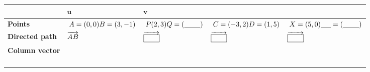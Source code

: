 \documentclass[12pt,a4paper]{article}
\begin{document}
\begin{center}
\small
\begin{tabularx}{\textwidth}{|>{\raggedright\arraybackslash}p{2cm}|>{\centering\arraybackslash}p{2cm}|>{\centering\arraybackslash}p{2cm}|>{\centering\arraybackslash}p{2.2cm}|>{\centering\arraybackslash}p{2.2cm}|}
\hline
& \textbf{\(\mathbf{u}\)} & \textbf{\(\mathbf{v}\)} & \textbf{\underline{\hspace{1.6cm}} } & \textbf{\underline{\hspace{1.6cm}} } \\
\hline

\textbf{Points } 
&
\(\;A = (0,0) \newline B = (3,-1) \)
&
\(\;P(2,3) \newline Q = (\underline{\hspace{0.8cm}})\)
&
\(\;C = (-3,2) \newline D = (1,5)\)
&
\(\;X = (5,0) \newline \underline{\hspace{0.5cm}} = (\underline{\hspace{0.8cm}})\)
\\
\hline

\textbf{Directed \newline path}
&
\( \newline \overrightarrow{AB} \)
&
\(\newline \overrightarrow{\boxed{\phantom{aaa}}} \)
&
\(\newline \overrightarrow{\boxed{\phantom{aaa}}} \)
&
\(\newline \overrightarrow{\boxed{\phantom{aaa}}} \)
\\
\hline



\textbf{Column \newline vector}
&
\(\begin{pmatrix} 3 \\ -1 \end{pmatrix}\)
&
\(\begin{pmatrix} 5 \\ 3 \end{pmatrix}\)
&
\(\begin{pmatrix}
\underline{\hspace{0.5cm}} \\[4pt]
\underline{\hspace{0.5cm}}
\end{pmatrix}\)
&
\(\begin{pmatrix}
\underline{\hspace{0.5cm}} \\[4pt]
\underline{\hspace{0.5cm}}
\end{pmatrix}\)
\\
\hline
\end{tabularx}
\end{center}
\end{document}
